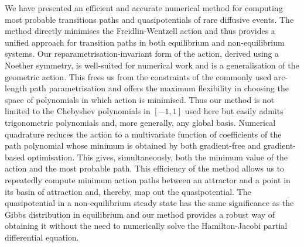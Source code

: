 We have presented an efficient and accurate numerical method for computing
most probable transitions paths and quasipotentials of rare diffusive
events. The method directly minimises the Freidlin-Wentzell action
and thus provides a unified approach for transition
paths in both equilibrium and non-equilibrium systems. Our reparametrisation-invariant
form of the action, derived using a Noether symmetry, is well-suited
for numerical work and is a generalisation of the geometric action.
This frees us from the constraints of the commonly used arc-length
path parametrisation and offers the maximum flexibility in choosing
the space of polynomials in which action is minimised. Thus our method
is not limited to the Chebyshev polynomials in $[-1,1]$ used here
but easily admits trigonometric polynomials and, more generally, any
global basis. Numerical quadrature reduces the action to a multivariate
function of coefficients of the path polynomial whose minimum is obtained
by both gradient-free and gradient-based optimisation. This gives,
simultaneously, both the minimum value of the action and the most
probable path. This efficiency of the method allows us to repeatedly
compute minimum action paths between an attractor and a point in its
basin of attraction and, thereby, map out the quasipotential. The
quasipotential in a non-equilibrium steady state has the same significance
as the Gibbs distribution in equilibrium and our method provides a
robust way of obtaining it without the need to numerically solve the
Hamilton-Jacobi partial differential equation. 
